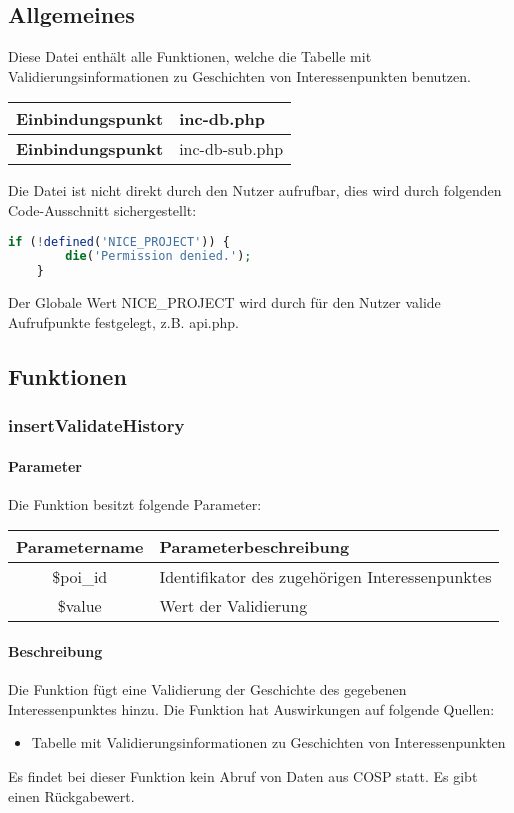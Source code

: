 \subsection{Allgemeines} Diese Datei enthält alle Funktionen, welche die Tabelle mit Validierungsinformationen zu Geschichten von Interessenpunkten benutzen.
\begin{table}[H]
	\begin{tabular}{|c|p{11cm}|}
		\hline
		\textbf{Einbindungspunkt} & inc-db.php \\ \hline
		\textbf{Einbindungspunkt} & inc-db-sub.php \\ \hline
	\end{tabular}
\end{table}
Die Datei ist nicht direkt durch den Nutzer aufrufbar, dies wird durch folgenden Code-Ausschnitt sichergestellt:
\begin{lstlisting}[language=php]
	if (!defined('NICE_PROJECT')) {
		die('Permission denied.');
	}
\end{lstlisting}
Der Globale Wert {\glqq NICE\_PROJECT\grqq} wird durch für den Nutzer valide Aufrufpunkte festgelegt, z.B. {\glqq api.php\grqq}.
\newpage
\subsection{Funktionen}
\subsubsection{insertValidateHistory}
\paragraph{Parameter} Die Funktion besitzt folgende Parameter:
\begin{table}[H]
	\begin{tabular}{|c|p{11cm}|}
		\hline
		\textbf{Parametername} & \textbf{Parameterbeschreibung} \\ \hline
		\$poi\_id & Identifikator des zugehörigen Interessenpunktes \\ \hline
		\$value   & Wert der Validierung \\ \hline
	\end{tabular}
\end{table}
\paragraph{Beschreibung} Die Funktion fügt eine Validierung der Geschichte des gegebenen Interessenpunktes hinzu. Die Funktion hat Auswirkungen auf folgende Quellen:
\begin{itemize}
	\item Tabelle mit Validierungsinformationen zu Geschichten von Interessenpunkten
\end{itemize}
Es findet bei dieser Funktion kein Abruf von Daten aus {\glqq COSP\grqq} statt. Es gibt einen Rückgabewert.
